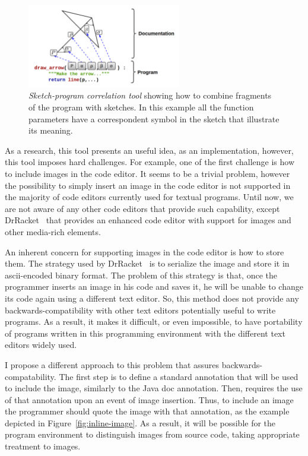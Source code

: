 \begin{figure}[!htbp]
  \centering
  \includegraphics[width=0.6\textwidth]{images/proposed-sc-tool}
    \caption{\textit{Sketch-program correlation tool} showing how to combine fragments of the program with sketches. In this example all the function parameters have a correspondent symbol in the sketch that illustrate its meaning.}
  \label{fig:sc-tool}
\end{figure}

As a research, this tool presents an useful idea, as an implementation, however, this tool imposes hard challenges. For example, one of the first challenge is how to include images in the code editor. It seems to be a trivial problem, however the possibility to simply insert an image in the code editor is not supported in the majority of code editors currently used for textual programs. Until now, we are not aware of any other code editors that provide such capability, except DrRacket~\citep{findler2002drscheme} that provides an enhanced code editor with support for images and other media-rich elements.

An inherent concern for supporting images in the code editor is how to store them. The strategy used by DrRacket~\citep{findler2002drscheme} is to serialize the image and store it in ascii-encoded binary format. The problem of this strategy is that, once the programmer inserts an image in his code and saves it, he will be unable to change its code again using a different text editor. So, this method does not provide any backwards-compatibility with other text editors potentially useful to write programs. As a result, it makes it difficult, or even impossible, to have portability of programs written in this programming environment with the different text editors widely used.

I propose a different approach to this problem that assures backwards-compatability. The first step is to define a standard annotation that will be used to include the image, similarly to the Java doc annotation. Then, requires the use of that annotation upon an event of image insertion. Thus, to include an image the programmer should quote the image with that annotation, as the example depicted in Figure~\ref{fig:inline-image}. As a result, it will be possible for the program environment to distinguish images from source code, taking appropriate treatment to images. 

